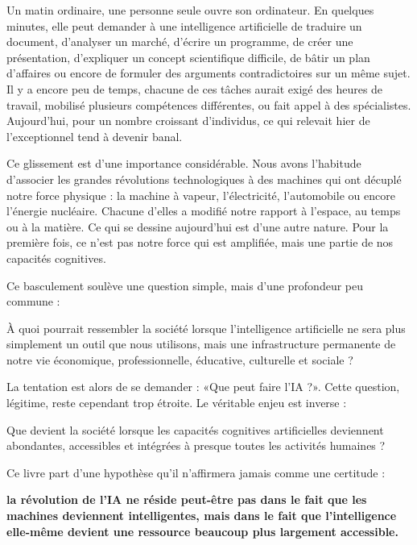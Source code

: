 
Un matin ordinaire, une personne seule ouvre son ordinateur. En quelques minutes, elle peut demander à une intelligence artificielle de traduire un document, d'analyser un marché, d'écrire un programme, de créer une présentation, d'expliquer un concept scientifique difficile, de bâtir un plan d'affaires ou encore de formuler des arguments contradictoires sur un même sujet. Il y a encore peu de temps, chacune de ces tâches aurait exigé des heures de travail, mobilisé plusieurs compétences différentes, ou fait appel à des spécialistes. Aujourd'hui, pour un nombre croissant d'individus, ce qui relevait hier de l'exceptionnel tend à devenir banal.

Ce glissement est d'une importance considérable. Nous avons l'habitude d'associer les grandes révolutions technologiques à des machines qui ont décuplé notre force physique : la machine à vapeur, l'électricité, l'automobile ou encore l'énergie nucléaire. Chacune d'elles a modifié notre rapport à l'espace, au temps ou à la matière. Ce qui se dessine aujourd'hui est d'une autre nature. Pour la première fois, ce n'est pas notre force qui est amplifiée, mais une partie de nos capacités cognitives.

Ce basculement soulève une question simple, mais d'une profondeur peu commune :

\begin{aiquote}
À quoi pourrait ressembler la société lorsque l'intelligence artificielle ne sera plus simplement un outil que nous utilisons, mais une infrastructure permanente de notre vie économique, professionnelle, éducative, culturelle et sociale ?
\end{aiquote}

La tentation est alors de se demander : «Que peut faire l'IA ?». Cette question, légitime, reste cependant trop étroite. Le véritable enjeu est inverse :

\begin{aiquote}
Que devient la société lorsque les capacités cognitives artificielles deviennent abondantes, accessibles et intégrées à presque toutes les activités humaines ?
\end{aiquote}

Ce livre part d'une hypothèse qu'il n'affirmera jamais comme une certitude :

\textbf{la révolution de l'IA ne réside peut-être pas dans le fait que les machines deviennent intelligentes, mais dans le fait que l'intelligence elle-même devient une ressource beaucoup plus largement accessible.}

